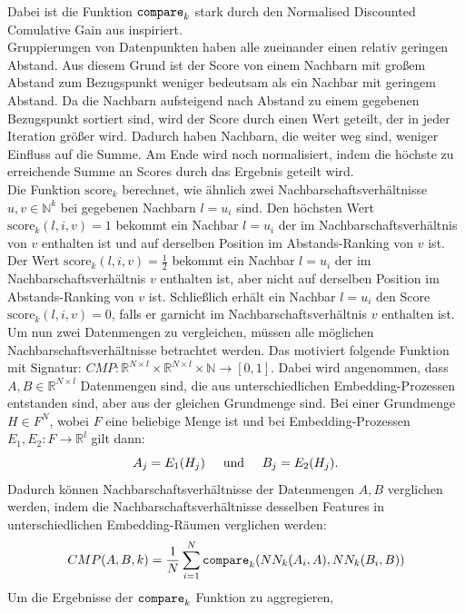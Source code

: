 \documentclass[12pt,letterpaper,ngerman]{article}
\begin{document}
Dabei ist die Funktion $\verb|compare|_k$ stark durch den
Normalised Discounted Comulative Gain aus \cite{ndcg} inspiriert.\\
Gruppierungen von Datenpunkten haben alle zueinander einen relativ
geringen Abstand. Aus diesem Grund ist der Score von einem Nachbarn mit
großem Abstand zum Bezugspunkt weniger bedeutsam als ein Nachbar mit
geringem Abstand. Da die Nachbarn aufsteigend nach Abstand zu einem
gegebenen Bezugspunkt sortiert sind, wird der Score durch einen Wert
geteilt, der in jeder Iteration größer wird. Dadurch haben Nachbarn,
die weiter weg sind, weniger Einfluss auf die Summe.  Am Ende wird noch
normalisiert, indem die höchste zu erreichende Summe an Scores durch 
das Ergebnis geteilt wird. \\
Die Funktion $\text{score}_k$ berechnet, wie ähnlich zwei 
Nachbarschaftsverhältnisse $u, v \in \mathbb{N}^k$ bei  gegebenen
Nachbarn $l = u_i$ sind. Den  höchsten Wert $\text{score}_k(l, i, v) = 1$
bekommt ein Nachbar $l = u_i$ der im Nachbarschaftsverhältnis von $v$
enthalten ist und auf derselben Position im Abstands-Ranking von $v$ ist. 
Der Wert  $\text{score}_k(l, i, v) = \frac{1}{2}$ bekommt ein Nachbar
$l = u_i$ der im Nachbarschaftsverhältnis $v$ enthalten ist, aber nicht auf
derselben Position im Abstands-Ranking von $v$ ist. Schließlich erhält ein 
Nachbar $l = u_i$ den Score $\text{score}_k(l, i, v) = 0$, falls er garnicht
im Nachbarschaftsverhältnis $v$ enthalten ist. \\
Um nun zwei Datenmengen zu vergleichen, müssen alle möglichen 
Nachbarschaftsverhältnisse betrachtet werden. Das motiviert folgende
Funktion mit Signatur:
$CMP: \mathbb{R}^{N\times l} \times  \mathbb{R}^{N\times l} \times \mathbb{N} \to [0,1]$.
Dabei wird angenommen, dass $A,B \in \mathbb{R}^{N\times l}$ Datenmengen
sind, die aus unterschiedlichen Embedding-Prozessen entstanden sind,
aber aus der gleichen Grundmenge sind. Bei einer Grundmenge $H \in F^N$,
wobei $F$ eine beliebige Menge ist und bei Embedding-Prozessen 
$E_1,E_2: F \to \mathbb{R}^{l}$ gilt dann:
\[
  A_j = E_1(H_j)  \hspace{0.5cm }\text{und} 
  \hspace{0.5cm } B_j = E_2(H_j).
\]
Dadurch können Nachbarschaftsverhältnisse der Datenmengen $A,B$ verglichen
werden, indem die Nachbarschaftsverhältnisse desselben Features in 
unterschiedlichen Embedding-Räumen verglichen werden:
\[
  CMP(A, B, k) = \frac{1}{N}\sum_{i = 1}^{N} \verb|compare|_k(NN_k(A_i,A),NN_k(B_i, B))
\]
Um die Ergebnisse der $\verb|compare|_k$ Funktion zu aggregieren,
\end{document}

